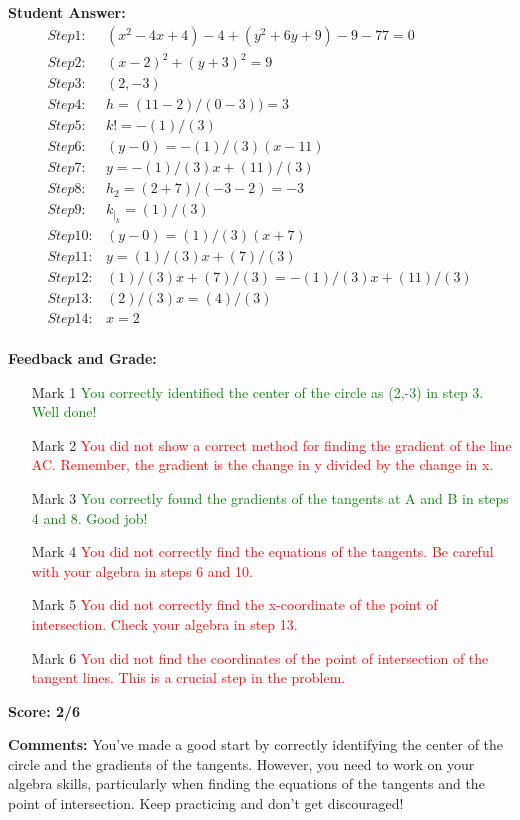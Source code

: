 \documentclass{article}
\begin{document}
\textbf{Student Answer:}
\begin{align*}
Step 1: & (x^{2}-4x+4)-4+(y^{2}+6y+9)-9-77=0 \\
Step 2: & (x-2)^{2}+(y+3)^{2}=9 \\
Step 3: & (2,-3) \\
Step 4: & h=(11-2)/(0-3))=3 \\
Step 5: & k!=-(1)/(3) \\
Step 6: & (y-0)=-(1)/(3)(x-11) \\
Step 7: & y=-(1)/(3)x+(11)/(3) \\
Step 8: & h_2=(2+7)/(-3-2)=-3 \\
Step 9: & k _|_ k=(1)/(3) \\
Step 10: & (y-0)=(1)/(3)(x+7) \\
Step 11: & y=(1)/(3)x+(7)/(3) \\
Step 12: & (1)/(3)x+(7)/(3)=-(1)/(3)x+(11)/(3) \\
Step 13: & (2)/(3)x=(4)/(3) \\
Step 14: & x=2 \\
\end{align*}

\textbf{Feedback and Grade:}
\begin{itemize}
\item[Mark 1] \textcolor{green}{You correctly identified the center of the circle as (2,-3) in step 3. Well done!}
\item[Mark 2] \textcolor{red}{You did not show a correct method for finding the gradient of the line AC. Remember, the gradient is the change in y divided by the change in x.}
\item[Mark 3] \textcolor{green}{You correctly found the gradients of the tangents at A and B in steps 4 and 8. Good job!}
\item[Mark 4] \textcolor{red}{You did not correctly find the equations of the tangents. Be careful with your algebra in steps 6 and 10.}
\item[Mark 5] \textcolor{red}{You did not correctly find the x-coordinate of the point of intersection. Check your algebra in step 13.}
\item[Mark 6] \textcolor{red}{You did not find the coordinates of the point of intersection of the tangent lines. This is a crucial step in the problem.}
\end{itemize}

\textbf{Score: 2/6}

\textbf{Comments:} You've made a good start by correctly identifying the center of the circle and the gradients of the tangents. However, you need to work on your algebra skills, particularly when finding the equations of the tangents and the point of intersection. Keep practicing and don't get discouraged!
\end{document}
